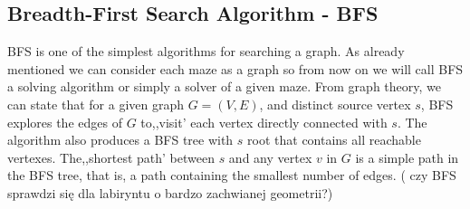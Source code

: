 \subsection{Breadth-First Search Algorithm - BFS}
BFS is one of the simplest algorithms for searching a graph. As already mentioned we can consider each maze as a graph so from now on we will call 
BFS a solving algorithm or simply a solver of a given maze. From graph theory, we can state that for a given graph $ G = ( V, E) $, and distinct source 
vertex $s$, BFS explores the edges of $G$ to,,visit' each vertex directly connected with $s$. The algorithm also produces a BFS tree with $s$ root that 
contains all reachable vertexes. The,,shortest path' between $s$ and any vertex $v$ in $G$ is a simple path in the BFS tree, that is, a path containing
 the smallest number of edges. \cite{3} ( czy BFS sprawdzi się dla labiryntu o bardzo zachwianej geometrii?)



\begin{lstlisting}

\end{lstlisting}




